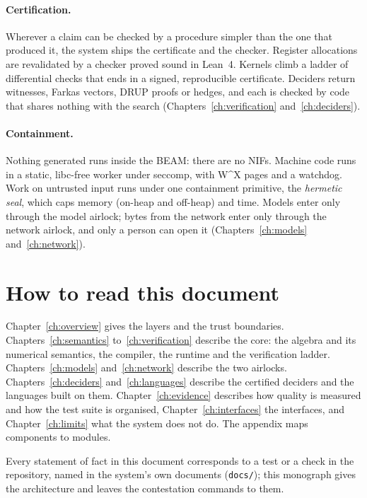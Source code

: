 \paragraph{Certification.} Wherever a claim can be checked by a procedure simpler than the one that
produced it, the system ships the certificate and the checker. Register allocations are revalidated by
a checker proved sound in Lean~4. Kernels climb a ladder of differential checks that ends in a signed,
reproducible certificate. Deciders return witnesses, Farkas vectors, DRUP proofs or hedges, and each is
checked by code that shares nothing with the search (Chapters~\ref{ch:verification}
and~\ref{ch:deciders}).

\paragraph{Containment.} Nothing generated runs inside the BEAM: there are no NIFs. Machine code runs in
a static, libc-free worker under seccomp, with W\^{}X pages and a watchdog. Work on untrusted input runs
under one containment primitive, the \emph{hermetic seal}, which caps memory (on-heap and off-heap) and
time. Models enter only through the model airlock; bytes from the network enter only through the
network airlock, and only a person can open it (Chapters~\ref{ch:models} and~\ref{ch:network}).

\section{How to read this document}

Chapter~\ref{ch:overview} gives the layers and the trust boundaries. Chapters~\ref{ch:semantics}
to~\ref{ch:verification} describe the core: the algebra and its numerical semantics, the compiler, the
runtime and the verification ladder. Chapters~\ref{ch:models} and~\ref{ch:network} describe the two
airlocks. Chapters~\ref{ch:deciders} and~\ref{ch:languages} describe the certified deciders and the
languages built on them. Chapter~\ref{ch:evidence} describes how quality is measured and how the test
suite is organised, Chapter~\ref{ch:interfaces} the interfaces, and Chapter~\ref{ch:limits} what the
system does not do. The appendix maps components to modules.

Every statement of fact in this document corresponds to a test or a check in the repository, named in
the system's own documents (\texttt{docs/}); this monograph gives the architecture and leaves the
contestation commands to them.
